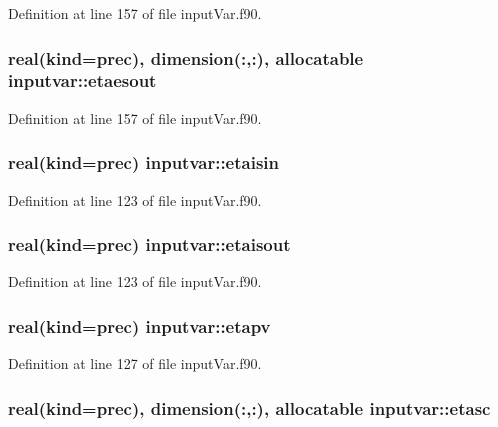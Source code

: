 Definition at line 157 of file input\-Var.\-f90.

\hypertarget{classinputvar_a3fdfebac3bb028ed7664d1bc4075855f}{
\subsubsection[{etaesout}]{\setlength{\rightskip}{0pt plus 5cm}real(kind=prec), dimension(\-:,\-:), allocatable inputvar\-::etaesout}}\label{classinputvar_a3fdfebac3bb028ed7664d1bc4075855f}


Definition at line 157 of file input\-Var.\-f90.

\hypertarget{classinputvar_ab16e97e62c61ca357fdb5a6ef4d54433}{
\subsubsection[{etaisin}]{\setlength{\rightskip}{0pt plus 5cm}real(kind=prec) inputvar\-::etaisin}}\label{classinputvar_ab16e97e62c61ca357fdb5a6ef4d54433}


Definition at line 123 of file input\-Var.\-f90.

\hypertarget{classinputvar_a983863d38cd184ba902b7f39e80ebb36}{
\subsubsection[{etaisout}]{\setlength{\rightskip}{0pt plus 5cm}real(kind=prec) inputvar\-::etaisout}}\label{classinputvar_a983863d38cd184ba902b7f39e80ebb36}


Definition at line 123 of file input\-Var.\-f90.

\hypertarget{classinputvar_abd526b84db5033c573303c7859b28963}{
\subsubsection[{etapv}]{\setlength{\rightskip}{0pt plus 5cm}real(kind=prec) inputvar\-::etapv}}\label{classinputvar_abd526b84db5033c573303c7859b28963}


Definition at line 127 of file input\-Var.\-f90.

\hypertarget{classinputvar_abf4e2424b8bd9e57417fa35d19c20a2d}{
\subsubsection[{etasc}]{\setlength{\rightskip}{0pt plus 5cm}real(kind=prec), dimension(\-:,\-:), allocatable inputvar\-::etasc}}\label{classinputvar_abf4e2424b8bd9e57417fa35d19c20a2d}


